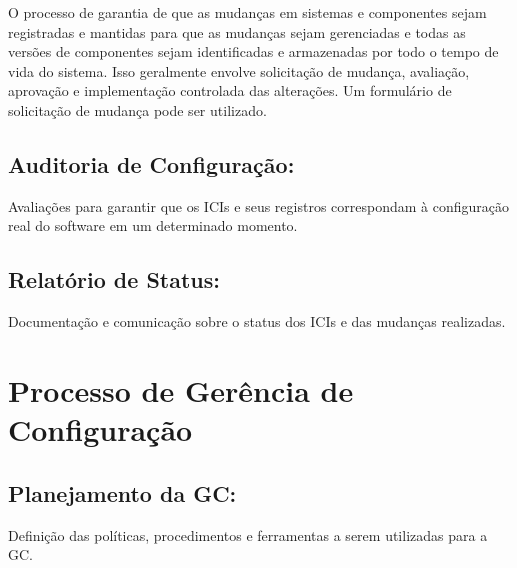 \documentclass[
]{book}
\begin{document}
O processo de garantia de que as mudanças em sistemas e componentes sejam registradas e mantidas para que as mudanças sejam gerenciadas e todas as versões de componentes sejam identificadas e armazenadas por todo o tempo de vida do sistema. Isso geralmente envolve solicitação de mudança, avaliação, aprovação e implementação controlada das alterações. Um formulário de solicitação de mudança pode ser utilizado.

\subsection{Auditoria de Configuração:}\label{auditoria-de-configurauxe7uxe3o}

Avaliações para garantir que os ICIs e seus registros correspondam à configuração real do software em um determinado momento.

\subsection{Relatório de Status:}\label{relatuxf3rio-de-status}

Documentação e comunicação sobre o status dos ICIs e das mudanças realizadas.

\section{Processo de Gerência de Configuração}\label{processo-de-geruxeancia-de-configurauxe7uxe3o}

\subsection{Planejamento da GC:}\label{planejamento-da-gc}

Definição das políticas, procedimentos e ferramentas a serem utilizadas para a GC.
\end{document}
